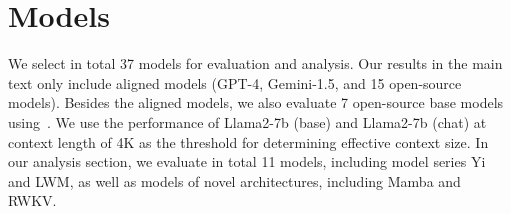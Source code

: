 \newpage
\appendix
\section{Models}
We select in total 37 models for evaluation and analysis. Our results in the main text only include aligned models (GPT-4, Gemini-1.5, and 15 open-source models). Besides the aligned models, we also evaluate 7 open-source base models using~. We use the performance of Llama2-7b (base) and Llama2-7b (chat) at context length of 4K as the threshold for determining effective context size. 
In our analysis section, we evaluate in total 11 models, including model series Yi and LWM, as well as models of novel architectures, including Mamba and RWKV. 

\label{models}


\clearpage
